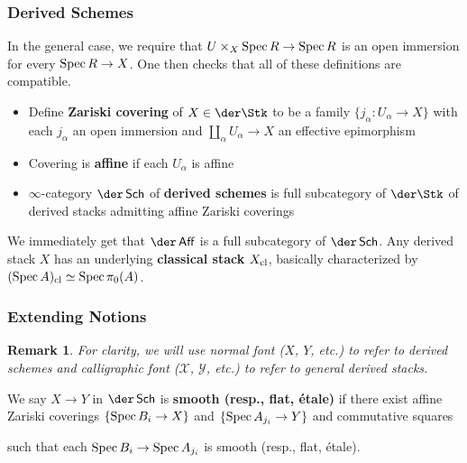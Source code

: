 \documentclass[11pt]{beamer}
\newtheorem*{remark*}{Remark}
\newcommand{\X}{\mathcal{X}}
\newcommand{\Y}{\mathcal{Y}}
\begin{document}
\begin{frame}
\frametitle{Derived Schemes}
\pause In the general case, we require that $U\times_X\operatorname{Spec} R\to\operatorname{Spec} R$ is an open immersion for every $\operatorname{Spec} R\to X$. One then checks that all of these definitions are compatible. 
\begin{itemize}
\pause\item Define \textbf{Zariski covering} of $X\in\der\Stk$ to be a family $\{j_{\alpha}: U_{\alpha}\to X\}$ with each $j_{\alpha}$ an open immersion and $\coprod_{\alpha}U_{\alpha}\to X$ an effective epimorphism
\pause\item Covering is \textbf{affine} if each $U_{\alpha}$ is affine
\pause\item $\infty$-category $\der\Sch$ of \textbf{derived schemes} is full subcategory of $\der\Stk$ of derived stacks admitting affine Zariski coverings
\end{itemize}
\pause We immediately get that $\der\Aff$ is a full subcategory of $\der\Sch$. \pause Any derived stack $X$ has an underlying \textbf{classical stack} $X_{\operatorname{cl}}$, basically characterized by $(\operatorname{Spec} A)_{\operatorname{cl}}\simeq\operatorname{Spec}\pi_0(A)$.
\end{frame}

\begin{frame}[fragile]
\frametitle{Extending Notions}
\pause
\begin{remark*}
For clarity, we will use normal font ($X$, $Y$, etc.) to refer to derived schemes and calligraphic font ($\X$, $\Y$, etc.) to refer to general derived stacks. 
\end{remark*}

\pause We say $X\to Y$ in $\der\Sch$ is \textbf{smooth (resp., flat, \'{e}tale)} if there exist affine Zariski coverings $\{\operatorname{Spec} B_i\to X\}$ and $\{\operatorname{Spec} A_{j_i}\to Y\}$ and commutative squares
\begin{center}
\end{center}
such that each $\operatorname{Spec} B_i\to\operatorname{Spec} A_{j_i}$ is smooth (resp., flat, \'{e}tale).
\end{frame}
\end{document}
